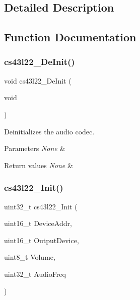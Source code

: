 \subsection{Detailed Description}


\subsection{Function Documentation}
\mbox{\label{group___c_s43_l22___exported___functions_gaeba1251bafcbeacb591dfe8cb8175447}} 
\subsubsection{\texorpdfstring{cs43l22\+\_\+\+De\+Init()}{cs43l22\_DeInit()}}
{\footnotesize\ttfamily void cs43l22\+\_\+\+De\+Init (\begin{DoxyParamCaption}\item[{void}]{ }\end{DoxyParamCaption})}



Deinitializes the audio codec. 


\begin{DoxyParams}{Parameters}
{\em None} & \\
\hline
\end{DoxyParams}

\begin{DoxyRetVals}{Return values}
{\em None} & \\
\hline
\end{DoxyRetVals}
\mbox{\label{group___c_s43_l22___exported___functions_ga47b373a281c7ba0ea0fac752f3d0a903}} 
\subsubsection{\texorpdfstring{cs43l22\+\_\+\+Init()}{cs43l22\_Init()}}
{\footnotesize\ttfamily uint32\+\_\+t cs43l22\+\_\+\+Init (\begin{DoxyParamCaption}\item[{uint16\+\_\+t}]{Device\+Addr,  }\item[{uint16\+\_\+t}]{Output\+Device,  }\item[{uint8\+\_\+t}]{Volume,  }\item[{uint32\+\_\+t}]{Audio\+Freq }\end{DoxyParamCaption})}



